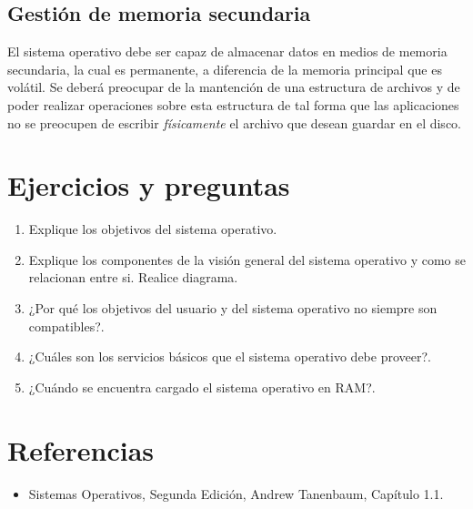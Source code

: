 \subsection{Gestión de memoria secundaria}
El sistema operativo debe ser capaz de almacenar datos en medios de memoria
secundaria, la cual es permanente, a diferencia de la memoria principal que es
volátil. Se deberá preocupar de la mantención de una estructura de archivos y de
poder realizar operaciones sobre esta estructura de tal forma que las
aplicaciones no se preocupen de escribir \textit{físicamente} el archivo que
desean guardar en el disco.

\section{Ejercicios y preguntas}
\begin{enumerate}

	\item Explique los objetivos del sistema operativo.

	\item Explique los componentes de la visión general del sistema
	operativo y como se relacionan entre si. Realice diagrama.

	\item ¿Por qué los objetivos del usuario y del sistema operativo no
	siempre son compatibles?.

	\item ¿Cuáles son los servicios básicos que el sistema operativo debe
	proveer?.

	\item ¿Cuándo se encuentra cargado el sistema operativo en RAM?.

\end{enumerate}

\section{Referencias}
\begin{itemize}

	\item Sistemas Operativos, Segunda Edición, Andrew Tanenbaum, Capítulo 1.1.

\end{itemize}
